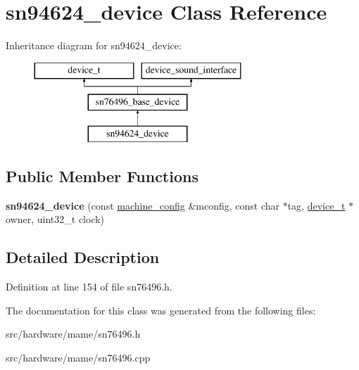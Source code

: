 \hypertarget{classsn94624__device}{\section{sn94624\-\_\-device Class Reference}
\label{classsn94624__device}
}
Inheritance diagram for sn94624\-\_\-device\-:\begin{figure}[H]
\begin{center}
\leavevmode
\includegraphics[height=3.000000cm]{classsn94624__device}
\end{center}
\end{figure}
\subsection*{Public Member Functions}
\begin{DoxyCompactItemize}
\item 
\hypertarget{classsn94624__device_a31fc340720a04c0e0400e088239c431a}{{\bfseries sn94624\-\_\-device} (const \hyperlink{structmachine__config}{machine\-\_\-config} \&mconfig, const char $\ast$tag, \hyperlink{classdevice__t}{device\-\_\-t} $\ast$owner, uint32\-\_\-t clock)}\label{classsn94624__device_a31fc340720a04c0e0400e088239c431a}

\end{DoxyCompactItemize}


\subsection{Detailed Description}


Definition at line 154 of file sn76496.\-h.



The documentation for this class was generated from the following files\-:\begin{DoxyCompactItemize}
\item 
src/hardware/mame/sn76496.\-h\item 
src/hardware/mame/sn76496.\-cpp\end{DoxyCompactItemize}
